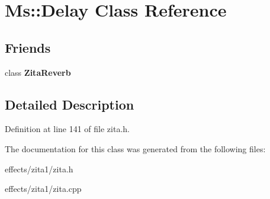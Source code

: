 \hypertarget{class_ms_1_1_delay}{}\section{Ms\+:\+:Delay Class Reference}
\label{class_ms_1_1_delay}
\subsection*{Friends}
\begin{DoxyCompactItemize}
\item 
\mbox{\label{class_ms_1_1_delay_a174ebfd5ad2853d19b5ec49485b195f0}} 
class {\bfseries Zita\+Reverb}
\end{DoxyCompactItemize}


\subsection{Detailed Description}


Definition at line 141 of file zita.\+h.



The documentation for this class was generated from the following files\+:\begin{DoxyCompactItemize}
\item 
effects/zita1/zita.\+h\item 
effects/zita1/zita.\+cpp\end{DoxyCompactItemize}
